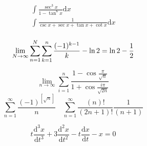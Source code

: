 \documentclass{article}
\begin{document}
\begin{align*}
    \int\frac{\sec^3 x}{1-\tan^6 x}\mathrm{d}x \\
    \int\frac{1}{\csc x+\sec x+\tan x +\cot x}\mathrm{d}x \\ 
\end{align*}

\clearpage
\begin{displaymath}
    \lim_{N \to \infty}\sum_{n=1}^N\sum_{k=1}^n\frac{(-1)^{k-1}}{k}-\ln 2  = \ln 2-\frac{1}{2} \newline 
\end{displaymath}

\begin{displaymath}
    \lim_{n \to \infty}\sum_{i=1}^{n}\frac{1-\cos\frac{\pi}{\sqrt{n}}}{1+\cos\frac{i\pi}{\sqrt{2n}}}
\end{displaymath}
\begin{displaymath}
    \sum_{n=1 }^\infty \frac{(-1)^{[\sqrt{n}]}}{n} \quad 
    \sum_{n=1}^{\infty} \frac{(n)!}{(2n+1)!}\frac{1}{(n+1)} 
\end{displaymath}

\begin{displaymath}
    t\frac{\mathrm{d}^3x}{\mathrm{d}t^3} + 3\frac{\mathrm{d}^2x}{\mathrm{d}t^2}-t\frac{\mathrm{d}x}{\mathrm{d}t}-x = 0
\end{displaymath}
\end{document}
